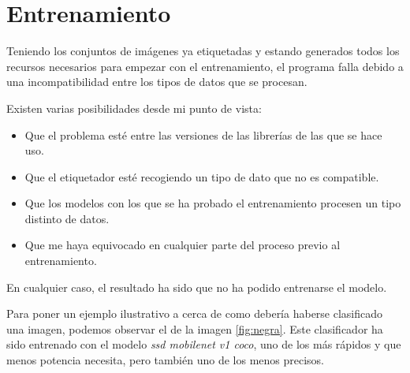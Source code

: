 
\section{Entrenamiento}
Teniendo los conjuntos de imágenes ya etiquetadas y estando generados todos los recursos necesarios para empezar con el entrenamiento, el programa falla debido a una incompatibilidad entre los tipos de datos que se procesan.

Existen varias posibilidades desde mi punto de vista:

\begin{itemize}
	\item Que el problema esté entre las versiones de las librerías de las que se hace uso. 
	
	\item Que el etiquetador esté recogiendo un tipo de dato que no es compatible.
	
	\item Que los modelos con los que se ha probado el entrenamiento procesen un tipo distinto de datos.
	
	\item Que me haya equivocado en cualquier parte del proceso previo al entrenamiento.
	
\end{itemize}

En cualquier caso, el resultado ha sido que no ha podido entrenarse el modelo.

Para poner un ejemplo ilustrativo a cerca de como debería haberse clasificado una imagen, podemos observar el de la imagen \ref{fig:negra}.
Este clasificador ha sido entrenado con el modelo \textit{ssd mobilenet v1 coco}, uno de los más rápidos y que menos potencia necesita, pero también uno de los menos precisos.
